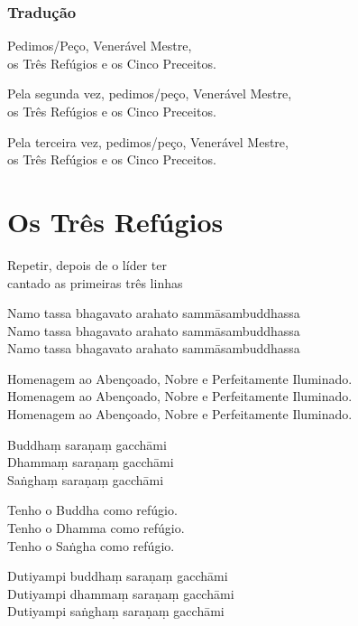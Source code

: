 \documentclass[
  babelLanguage=portuguese,
  final,
]{chantingbook}
\begin{document}
\subsection{Tradução}

\begin{english}
  Pedimos/Peço, Venerável Mestre,\\
  \vin os Três Refúgios e os Cinco Preceitos.

  Pela segunda vez, pedimos/peço, Venerável Mestre,\\
  \vin os Três Refúgios e os Cinco Preceitos.

  Pela terceira vez, pedimos/peço, Venerável Mestre,\\
  \vin os Três Refúgios e os Cinco Preceitos.
\end{english}

\clearpage
\chapter{Os Três Refúgios}

\begin{instruction}
  Repetir, depois de o líder ter\\
  cantado as primeiras três linhas
\end{instruction}

Namo tassa bhagavato arahato sammāsambuddhassa\\
Namo tassa bhagavato arahato sammāsambuddhassa\\
Namo tassa bhagavato arahato sammāsambuddhassa

\begin{english}
  Homenagem ao Abençoado, Nobre e Perfeitamente Iluminado.\\
  Homenagem ao Abençoado, Nobre e Perfeitamente Iluminado.\\
  Homenagem ao Abençoado, Nobre e Perfeitamente Iluminado.
\end{english}

Buddhaṃ saraṇaṃ gacchāmi\\
Dhammaṃ saraṇaṃ gacchāmi\\
Saṅghaṃ saraṇaṃ gacchāmi

\begin{english}
  Tenho o Buddha como refúgio.\\
  Tenho o Dhamma como refúgio.\\
  Tenho o Saṅgha como refúgio.
\end{english}

Dutiyampi buddhaṃ saraṇaṃ gacchāmi\\
Dutiyampi dhammaṃ saraṇaṃ gacchāmi\\
Dutiyampi saṅghaṃ saraṇaṃ gacchāmi
\end{document}
